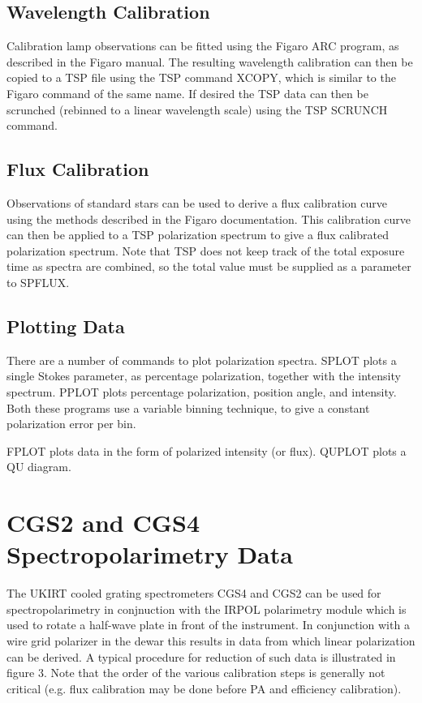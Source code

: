 \subsection{Wavelength Calibration}

Calibration lamp observations can be fitted using the Figaro ARC program,
as described in the Figaro manual. The resulting wavelength calibration
can then be copied to a TSP file using the TSP command XCOPY, which is
similar to the Figaro command of the same name. If desired the TSP data
can then be scrunched (rebinned to a linear wavelength scale) using the
TSP SCRUNCH command.

\subsection{Flux Calibration}

Observations of standard stars can be used to derive a flux calibration
curve using the methods described in the Figaro documentation. This calibration
curve can then be applied to a TSP polarization spectrum to give a flux
calibrated polarization spectrum. Note that TSP does not keep track of the
total exposure time as spectra are combined, so the total value must be 
supplied as a parameter to SPFLUX.

\subsection{Plotting Data}

There are a number of commands to plot polarization spectra. SPLOT plots
a single Stokes parameter, as percentage polarization, together with the
intensity spectrum. PPLOT plots percentage polarization, position angle,
and intensity. Both these programs use a variable binning technique, to 
give a constant polarization error per bin.

FPLOT plots data in the form of polarized intensity (or flux). QUPLOT
plots a QU diagram.

\section{CGS2 and CGS4 Spectropolarimetry Data}

The UKIRT cooled grating spectrometers CGS4 and CGS2 can be used for spectropolarimetry
in conjnuction with the IRPOL polarimetry module which is used to rotate a
half-wave plate in front of the instrument. In conjunction with a wire grid
polarizer in the dewar this results in data from which linear polarization can
be derived. A typical procedure for reduction of such data is illustrated in
figure 3. Note that the order of the various calibration steps is generally not
critical (e.g. flux calibration may be done before PA and efficiency
calibration).


